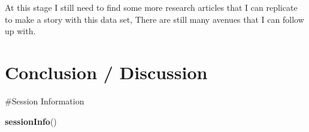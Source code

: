 \documentclass[
]{article}
\newenvironment{Shaded}{\begin{snugshade}}{\end{snugshade}}
\newcommand{\FunctionTok}[1]{\textcolor[rgb]{0.13,0.29,0.53}{\textbf{#1}}}
\newcommand{\NormalTok}[1]{#1}
\begin{document}
At this stage I still need to find some more research articles that I can replicate to make a story with this data set, There are still many avenues that I can follow up with.

\section{Conclusion / Discussion}\label{conclusion-discussion}

\newpage

\#Session Information

\begin{Shaded}
\begin{Highlighting}[]
\FunctionTok{sessionInfo}\NormalTok{()}
\end{Highlighting}
\end{Shaded}
\end{document}
